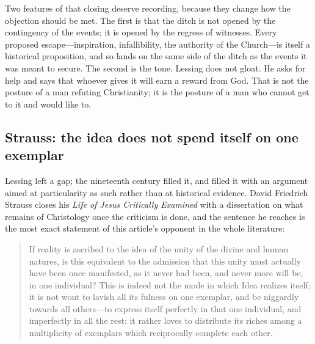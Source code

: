 Two features of that closing deserve recording, because they change how the objection should be met. The first is that the ditch is not opened by the contingency of the events; it is opened by the regress of witnesses. Every proposed escape---inspiration, infallibility, the authority of the Church---is itself a historical proposition, and so lands on the same side of the ditch as the events it was meant to secure. The second is the tone. Lessing does not gloat. He asks for help and says that whoever gives it will earn a reward from God. That is not the posture of a man refuting Christianity; it is the posture of a man who cannot get to it and would like to.

\subsection{Strauss: the idea does not spend itself on one exemplar}

Lessing left a gap; the nineteenth century filled it, and filled it with an argument aimed at particularity as such rather than at historical evidence. David Friedrich Strauss closes his \emph{Life of Jesus Critically Examined} with a dissertation on what remains of Christology once the criticism is done, and the sentence he reaches is the most exact statement of this article's opponent in the whole literature:

\begin{quote}\small
If reality is ascribed to the idea of the unity of the divine and human natures, is this equivalent to the admission that this unity must actually have been once manifested, as it never had been, and never more will be, in one individual? This is indeed not the mode in which Idea realizes itself; it is not wont to lavish all its fulness on one exemplar, and be niggardly towards all others---to express itself perfectly in that one individual, and imperfectly in all the rest: it rather loves to distribute its riches among a multiplicity of exemplars which reciprocally complete each other.
\end{quote}

